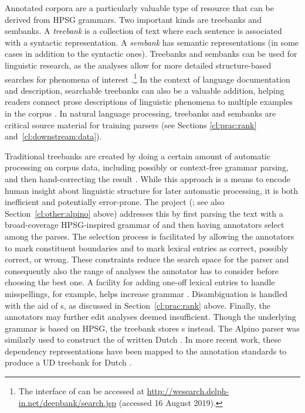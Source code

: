 \documentclass[output=paper
                ,modfonts
                ,nonflat
	        ,collection
	        ,collectionchapter
	        ,collectiontoclongg
 	        ,biblatex
                ,babelshorthands
                ,newtxmath
                ,draftmode
                ,colorlinks, citecolor=brown
]{./langsci/langscibook}
\begin{document}
Annotated corpora are a particularly valuable
type of resource that can be derived from HPSG grammars.
Two important kinds are treebanks and sembanks.
A \textit{treebank} is a collection of text
where each sentence is associated with a syntactic representation.
A \textit{sembank} has semantic representations (in some cases
in addition to the syntactic ones). Treebanks and sembanks can be used
for linguistic research, as the analyses allow for more detailed
structure-based searches for phenomena of interest \citep{Rohde:05,Gho:Bir:10,Kou:Oep:14}.\footnote{The  interface of \citet{Kou:Oep:14} can be accessed at \url{http://wesearch.delph-in.net/deepbank/search.jsp} (accessed 16 August 2019).}
In the context of language documentation and description, searchable
treebanks can also be a valuable addition, helping readers connect
prose descriptions of linguistic phenomena to multiple examples in the
corpus \citep{Ben:Gho:Bal:Dri:12}. In natural language processing,
treebanks and sembanks are critical source material for training parsers (see Sections \ref{cl:prac:rank} and~\ref{cl:downstream:data}).

Traditional treebanks are created by doing a certain amount of
automatic processing on corpus data,
including possibly  or context-free grammar parsing, and
then hand-correcting the result \citep{Mar:San:Mar:93,Ban:Bon:Cai:13}.
While this approach is a means to encode human insight about
linguistic structure for later automatic processing, it is both
inefficient and potentially error-prone. The  project
(\citealt{vanderbeek2002alpino}; see also Section~\ref{cl:other:alpino} above) addresses this by first parsing the text
with a broad-coverage HPSG-inspired grammar of  and then having
annotators select among the parses.
The selection process is facilitated by allowing the annotators
to mark constituent boundaries
and to mark lexical entries as correct, possibly correct, or wrong.
These constraints reduce the search space for the parser and consequently
also the range of analyses the annotator has to consider before
choosing the best one. A facility for adding one-off lexical entries to handle
misspellings, for example, helps increase grammar .  Disambiguation is
handled with the aid of s, as discussed in Section~\ref{cl:prac:rank} above. Finally,
the annotators may further edit analyses deemed insufficient. Though
the underlying grammar is based on HPSG, the treebank stores
s instead.  The Alpino parser was similarly
used to construct the  of written Dutch
\citep{van:bou:van:13}.  In more recent work, these dependency
representations have been mapped to the 
annotation standards \citep{Niv:Mar:Gin:16} to produce a UD treebank
for Dutch \citep{Bou:Van:17}.
\end{document}
